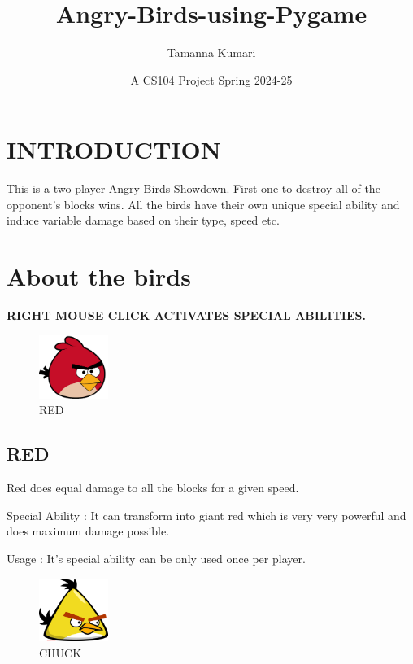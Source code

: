 \documentclass{article}
\title{Angry-Birds-using-Pygame}
\author{Tamanna Kumari}
\date{A CS104 Project Spring 2024-25}
\begin{document}
\maketitle
\tableofcontents
\newpage

\section{INTRODUCTION}
This is a two-player Angry Birds Showdown. First one to destroy all of the opponent's blocks wins. All the birds have their own unique special ability and induce variable damage based on their type, speed etc.

\section{About the birds}
\begin{center}
    \textbf{RIGHT MOUSE CLICK ACTIVATES SPECIAL ABILITIES.}
\end{center}


\begin{figure}[h!]
    \centering
    \includegraphics[width = 0.2\textwidth]{../Resources/red.png}
    \caption{RED}
    \label{fig : RED}
\end{figure}

\subsection{RED}

Red does equal damage to all the blocks for a given speed.

Special Ability : It can transform into giant red which is very very powerful and does maximum damage possible. 

Usage : It's special ability can be only used once per player.


\begin{figure}[h!]
    \centering
    \includegraphics[width = 0.2\textwidth]{../Resources/fast_yellow.png}
    \caption{CHUCK}
    \label{fig : CHUCK}
\end{figure}
\end{document}
